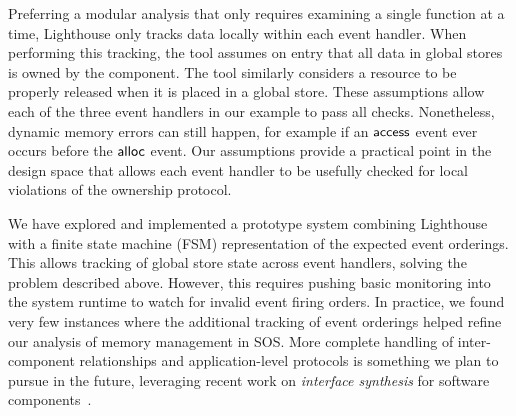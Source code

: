 Preferring a modular analysis that only requires examining a single function
at a time, Lighthouse only tracks data locally within each event handler.  
%
When performing this tracking, the tool assumes on entry that all data in
global stores is owned by the component.
%
The tool similarly considers a resource to be properly released when it is
placed in a global store.  
%
These assumptions allow each of the three event handlers in our example to
pass all checks.  
%
Nonetheless, dynamic memory errors can still happen, for example if an
${\mathsf{access}}$ event ever occurs before the ${\mathsf{alloc}}$ event.  
%
Our assumptions provide a practical point in the design space that allows each
event handler to be usefully checked for local violations of the ownership
protocol.  



We have explored and implemented a prototype system combining Lighthouse with
a finite state machine (FSM) representation of the expected event orderings.
%
This allows tracking of global store state across event handlers, solving
the problem described above.
%
However, this requires pushing basic monitoring into the system runtime to
watch for invalid event firing orders.
%
In practice, we found very few instances where the additional tracking of event
orderings helped refine our analysis of memory management in SOS.
%
More complete handling of inter-component relationships and application-level
protocols is something we plan to pursue in the future, leveraging recent work
on {\em interface synthesis} for software components~\cite{AlurPOPL05,HJM05}.

